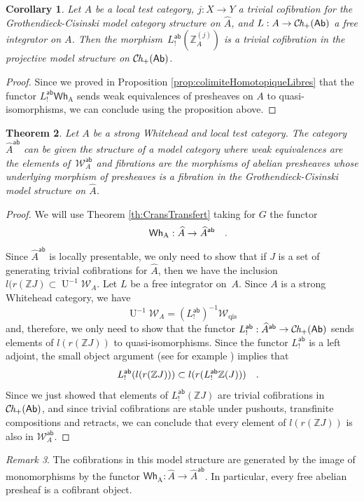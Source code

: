 \documentclass[10pt, english, a4paper, nothms]{amsart}
\theoremstyle{plain}
\newtheorem{theorem}{Theorem}[section]
\newtheorem{coro}[theorem]{Corollary}
\theoremstyle{remark}
\newtheorem{remark}[theorem]{Remark}
\theoremstyle{definition}
\numberwithin{equation}{theorem}
\newcommand\Z{\mathbb{Z}}
\newcommand{\Ch}{{\mathcal{C}\mspace{-2.mu}\it{h}_{+}}}
\newcommand{\pref}[1]{{\widehat{ #1 }}}
\newcommand{\W}{\mathcal{W}}
\newcommand{\Ab}{{\mathsf{Ab}}}
\newcommand{\ab}{{\mathsf{ab}}}
\newcommand{\Wh}[2]{\Z_{#1}^{\left(#2\right)}}
\newcommand{\Whf}[1]{\operatorname{\mathsf{Wh}_{#1}}}
\newcommand{\prefab}[1]{\widehat{ #1 }^{\mathsf{ab}}}
\newcommand{\Wab}{\W^{\ab}}
\DeclareMathOperator{\U}{U}
\newcommand\zbox[1]{\makebox[0pt][l]{#1}}
\newcommand\pbox[1]{\zbox{\quad #1}} %
\begin{document}
\begin{coro}\label{homologielibrecofibtriviale}
Let $A$ be a local test category, $j: X \to Y$ a trivial cofibration
for the Grothendieck-Cisinski model category structure on $\pref{A}$,
and $L: A \to \Ch(\Ab)$ a free integrator on $A$. Then the
morphism~$L^\ab_!(\Wh{A}{j})$ is a trivial cofibration in the projective
model structure on $\Ch(\Ab)$. 
\end{coro}
\begin{proof}
Since we proved in Proposition \ref{prop:colimiteHomotopiqueLibres}
that the functor $L^\ab_!\Whf{A}$ sends weak equivalences of
presheaves on $A$ to quasi-isomorphisms,
we can conclude using the proposition above.
\end{proof}

\begin{theorem}\label{thm:modelStructureAbPresheaves}
Let $A$ be a strong Whitehead and local test category. The category
$\prefab{A}$ can be given the structure of a model category where weak
equivalences are the elements of~$\Wab_A$ and fibrations are the morphisms of
abelian presheaves whose underlying morphism of presheaves is a
fibration in the Grothendieck-Cisinski model structure on $\pref{A}$.
\end{theorem}
\begin{proof}
We will use Theorem \ref{th:CransTransfert} taking for $G$ the functor
\[
\Whf{A}: \pref{A}\to\prefab{A} \pbox{.}
\]
Since $\prefab{A}$ is locally presentable, we only need to show that
if $J$ is a set of generating trivial cofibrations for $\pref{A}$,
then we have the inclusion $l(r(\Z J) \subset \U^{-1}\W_A$. Let $L$ be
a free integrator on~$A$. Since $A$ is a strong Whitehead category, we have
\[
\U^{-1}\W_A = (L_!^\ab)^{-1}\W_{\mathrm{qis}}
\]
and, therefore, we only need to show that the functor $L^\ab_!:
\prefab{A} \to \Ch(\Ab)$ sends elements of $l(r(\Z J))$ to
quasi-isomorphisms. Since the functor $L^\ab_!$ is a left adjoint, the
small object argument (see for example \cite[Corollary
10.5.22]{hirschhorn2003model}) implies that 
\[
L^\ab_!(l(r(\Z J))) \subset l(r(L^\ab_!\Z(J))) \pbox{.}
\]
Since we just showed that elements of $L^\ab_!(\Z J)$ are trivial
cofibrations in $\Ch(\Ab)$, and since trivial cofibrations are stable
under pushouts, transfinite compositions and retracts, we can
conclude that every element of $l(r(\Z J))$ is also in $\Wab_A$.
\end{proof}

\begin{remark}
The cofibrations in this model structure are generated by the image of
monomorphisms by the functor $\Whf{A}: \pref{A}\to\prefab{A}$. In
particular, every free abelian presheaf is a cofibrant object.
\end{remark}
\end{document}
